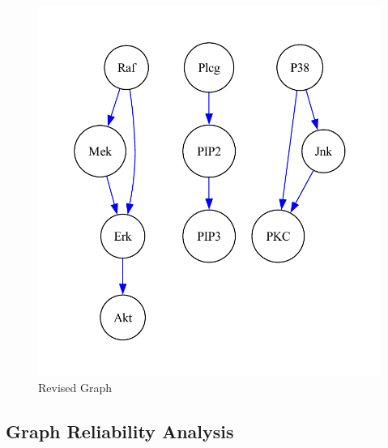 \documentclass{article}
\begin{document}
\hfill
\begin{minipage}[t]{0.4\linewidth}
    \begin{figure}[H]
        \centering
        \vspace{-0.5cm}
        \includegraphics[width=\linewidth]{./demo_data/20241104_135804/sachs/output_graph/revised_graph.pdf}
        \caption{\label{fig:corr}Revised Graph}
    \end{figure}
\end{minipage}


\subsection{Graph Reliability Analysis}
\end{document}
